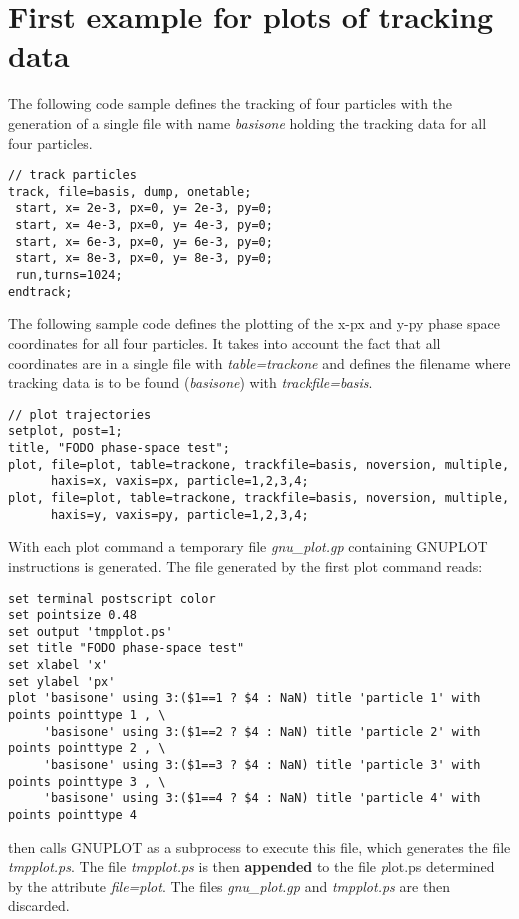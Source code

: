 \section{First example for plots of tracking data}
\label{sec:plot_example_1}

The following \madx code sample defines the tracking of four particles 
with the generation of a single file with name \textit{basisone} 
holding the tracking data for all four particles.  

\begin{verbatim}
// track particles
track, file=basis, dump, onetable;
 start, x= 2e-3, px=0, y= 2e-3, py=0;
 start, x= 4e-3, px=0, y= 4e-3, py=0;
 start, x= 6e-3, px=0, y= 6e-3, py=0;
 start, x= 8e-3, px=0, y= 8e-3, py=0;
 run,turns=1024;
endtrack;
\end{verbatim}

The following sample code defines the plotting of the x-px and y-py
phase space coordinates for all four particles. 
It takes into account the fact that all coordinates are in a single file 
with \textit{table=trackone} and defines the filename where tracking data 
is to be found (\textit{basisone}) with \textit{trackfile=basis}. 

\begin{verbatim}
// plot trajectories
setplot, post=1; 
title, "FODO phase-space test";
plot, file=plot, table=trackone, trackfile=basis, noversion, multiple, 
      haxis=x, vaxis=px, particle=1,2,3,4; 
plot, file=plot, table=trackone, trackfile=basis, noversion, multiple, 
      haxis=y, vaxis=py, particle=1,2,3,4;
\end{verbatim}

With each plot command a temporary file \textit{gnu\_plot.gp} containing
GNUPLOT instructions is generated.  
The file generated by the first plot command reads: 

{\footnotesize \begin{verbatim}  
set terminal postscript color
set pointsize 0.48
set output 'tmpplot.ps'
set title "FODO phase-space test"
set xlabel 'x'
set ylabel 'px'
plot 'basisone' using 3:($1==1 ? $4 : NaN) title 'particle 1' with points pointtype 1 , \
     'basisone' using 3:($1==2 ? $4 : NaN) title 'particle 2' with points pointtype 2 , \
     'basisone' using 3:($1==3 ? $4 : NaN) title 'particle 3' with points pointtype 3 , \
     'basisone' using 3:($1==4 ? $4 : NaN) title 'particle 4' with points pointtype 4 
\end{verbatim}}

\madx then calls GNUPLOT as a subprocess to execute this file, which
generates the file \textit{tmpplot.ps}.  
The file \textit{tmpplot.ps} is then {\bf appended} to the file 
{\textit plot.ps} determined by the attribute \textit{file=plot}.  
The files \textit{gnu\_plot.gp} and \textit{tmpplot.ps} are then
discarded. 

